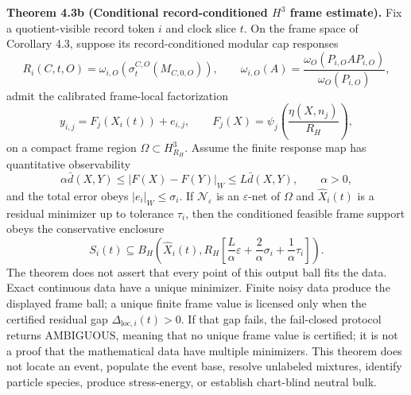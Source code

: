 \textbf{Theorem 4.3b (Conditional record-conditioned \(H^3\) frame estimate).} Fix a quotient-visible record token \(i\) and clock slice \(t\). On the frame space of Corollary 4.3, suppose its record-conditioned modular cap responses
\[
R_i(C,t,O)=\omega_{i,O}\!\left(\sigma_t^{C,O}(M_{C,0,O})\right),
\qquad
\omega_{i,O}(A)=\frac{\omega_O(P_{i,O}AP_{i,O})}{\omega_O(P_{i,O})},
\]
admit the calibrated frame-local factorization
\[
y_{i,j}=F_j(X_i(t))+e_{i,j},\qquad
F_j(X)=\psi_j\!\left(\frac{\eta(X,n_j)}{R_H}\right),
\]
on a compact frame region \(\Omega\subset H^3_{R_H}\). Assume the finite response map has quantitative observability
\[
\alpha \bar d(X,Y)\le |F(X)-F(Y)|_W\le L\bar d(X,Y),\qquad \alpha>0,
\]
and the total error obeys \(|e_i|_W\le\sigma_i\). If \(\mathcal N_\varepsilon\) is an \(\varepsilon\)-net of \(\Omega\) and \(\widehat X_i(t)\) is a residual minimizer up to tolerance \(\tau_i\), then the conditioned feasible frame support obeys the conservative enclosure
\[
S_i(t)\subseteq B_H\!\left(\widehat X_i(t),
R_H\left[\frac L\alpha\varepsilon+\frac2\alpha\sigma_i+\frac1\alpha\tau_i\right]\right).
\]
The theorem does not assert that every point of this output ball fits the
data.
Exact continuous data have a unique minimizer. Finite noisy data produce the displayed frame ball; a unique finite frame value is licensed only when the certified residual gap \(\Delta_{\mathrm{loc},i}(t)>0\). If that gap fails, the fail-closed protocol returns \(\mathrm{AMBIGUOUS}\), meaning that no unique frame value is certified; it is not a proof that the mathematical data have multiple minimizers. This theorem does not locate an event, populate the event base, resolve unlabeled mixtures, identify particle species, produce stress-energy, or establish chart-blind neutral bulk.

